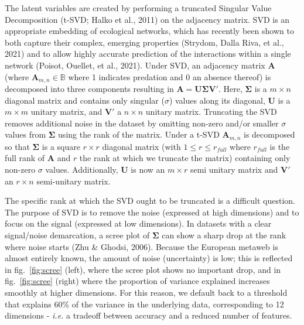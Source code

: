 \documentclass[11pt]{article}
\begin{document}
The latent variables are created by performing a truncated Singular
Value Decomposition (t-SVD; Halko et al., 2011) on the adjacency matrix.
SVD is an appropriate embedding of ecological networks, which has
recently been shown to both capture their complex, emerging properties
(Strydom, Dalla Riva, et al., 2021) and to allow highly accurate
prediction of the interactions within a single network (Poisot, Ouellet,
et al., 2021). Under SVD, an adjacency matrix \(\mathbf{A}\) (where
\(\mathbf{A}_{m,n}\in\mathbb{B}\) where 1 indicates predation and 0 an
absence thereof) is decomposed into three components resulting in
\(\mathbf{A} = \mathbf{U}\mathbf{\Sigma}\mathbf{V'}.\) Here,
\(\mathbf{\Sigma}\) is a \(m \times n\) diagonal matrix and contains
only singular (\(\sigma\)) values along its diagonal, \(\mathbf{U}\) is
a \(m \times m\) unitary matrix, and \(\mathbf{V}'\) a \(n \times n\)
unitary matrix. Truncating the SVD removes additional noise in the
dataset by omitting non-zero and/or smaller \(\sigma\) values from
\(\mathbf{\Sigma}\) using the rank of the matrix. Under a t-SVD
\(\mathbf{A}_{m,n}\) is decomposed so that \(\mathbf{\Sigma}\) is a
square \(r \times r\) diagonal matrix (with \(1 \le r \le r_{full}\)
where \(r_{full}\) is the full rank of \(\mathbf{A}\) and \(r\) the rank
at which we truncate the matrix) containing only non-zero \(\sigma\)
values. Additionally, \(\mathbf{U}\) is now an \(m \times r\) semi
unitary matrix and \(\mathbf{V}'\) an \(r \times n\) semi-unitary
matrix.

The specific rank at which the SVD ought to be truncated is a difficult
question. The purpose of SVD is to remove the noise (expressed at high
dimensions) and to focus on the signal (expressed at low dimensions). In
datasets with a clear signal/noise demarcation, a scree plot of
\(\mathbf{\Sigma}\) can show a sharp drop at the rank where noise starts
(Zhu \& Ghodsi, 2006). Because the European metaweb is almost entirely
known, the amount of noise (uncertainty) is low; this is reflected in
fig.~\ref{fig:scree} (left), where the scree plot shows no important
drop, and in fig.~\ref{fig:scree} (right) where the proportion of
variance explained increases smoothly at higher dimensions. For this
reason, we default back to a threshold that explains 60\% of the
variance in the underlying data, corresponding to 12 dimensions -
\emph{i.e.} a tradeoff between accuracy and a reduced number of
features.
\end{document}
